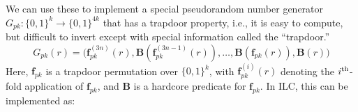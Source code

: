  We can use these to implement a special
pseudorandom number generator $G_{pk}
\colon \{0,1\}^k \to \{0,1\}^{4k}$ that has a trapdoor property, i.e., it is easy
to compute, but difficult to invert except with special information called the
``trapdoor.''
\[ G_{pk}(r) = \big(\mathbf{f}_{pk}^{(3n)}(r),
\mathbf{B}(\mathbf{f}_{pk}^{(3n-1)}(r)), \ldots, \mathbf{B}(\mathbf{f}_{pk}(r)),
\mathbf{B}(r)\big)\]
\noindent Here, $\mathbf{f}_{pk}$ is a trapdoor permutation over $\{0,1\}^{k}$,
with $\mathbf{f}_{pk}^{(i)}(r)$ denoting the $i^{\textnormal{th}}$-fold
application of $\mathbf{f}_{pk}$, and $\mathbf{B}$ is a hardcore predicate for
$\mathbf{f}_{pk}$. In ILC, this can be implemented as:



